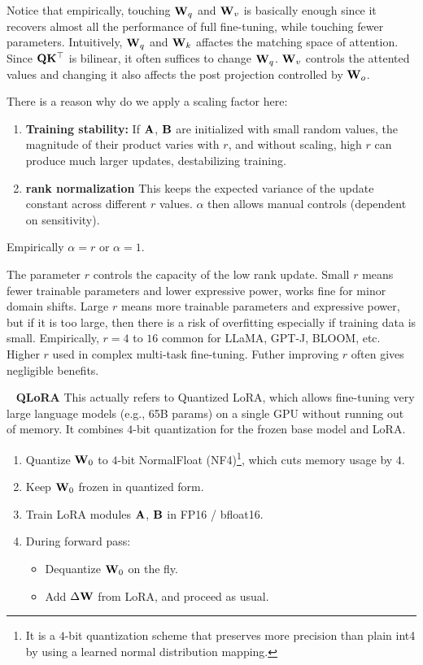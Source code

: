 \documentclass[11pt]{article}  %
\begin{document}
Notice that empirically, touching $\mathbf{W}_q$ and $\mathbf{W}_v$ is basically enough since it recovers almost all the performance of full fine-tuning, while touching fewer parameters.
Intuitively, $\mathbf{W}_q$ and $\mathbf{W}_k$ affactes the matching space of attention.
Since $\mathbf{Q}\mathbf{K}^{\top}$ is bilinear, it often suffices to change $\mathbf{W}_q$.  
$\mathbf{W}_v$ controls the attented values and changing it also affects the post projection controlled by $\mathbf{W}_o$.

There is a reason why do we apply a scaling factor here:
\begin{enumerate}
  \item \textbf{Training stability:} If $\mathbf{A}$, $\mathbf{B}$ are initialized with small random values, the magnitude of their product varies with $r$, and without scaling, high $r$ can produce much larger updates, destabilizing training. 
  \item \textbf{rank normalization} This keeps the expected variance of the update constant across different $r$ values. 
  $\alpha$ then allows manual controls (dependent on sensitivity).
\end{enumerate}
Empirically $\alpha = r$ or $\alpha = 1$.

The parameter $r$ controls the capacity of the low rank update.
Small $r$ means fewer trainable parameters and lower expressive power, works fine for minor domain shifts.
Large $r$ means more trainable parameters and expressive power, but if it is too large, then there is a risk of overfitting especially if training data is small. 
Empirically, $r = 4$ to $16$ common for LLaMA, GPT-J, BLOOM, etc.
Higher $r$ used in complex multi-task fine-tuning.
Futher improving $r$ often gives negligible benefits.


\textbullet~ \textbf{QLoRA}
This actually refers to Quantized LoRA, which allows fine-tuning very large language models (e.g., 65B params) on a single GPU without running out of memory.
It combines $4$-bit quantization for the frozen base model and LoRA.

\begin{enumerate}
  \item Quantize $\mathbf{W}_0$ to $4$-bit NormalFloat (NF4)\footnote{It is a $4$-bit quantization scheme that preserves more precision than plain int4 by using a learned normal distribution mapping.}, which cuts memory usage by $4$.
  \item Keep $\mathbf{W}_0$ frozen in quantized form.
  \item Train LoRA modules $\mathbf{A}$, $\mathbf{B}$ in FP16 / bfloat16.
  \item During forward pass: \begin{itemize}
    \item Dequantize $\mathbf{W}_0$ on the fly.
    \item Add $\Delta \mathbf{W}$ from LoRA, and proceed as usual.
  \end{itemize}
\end{enumerate}
\end{document}
